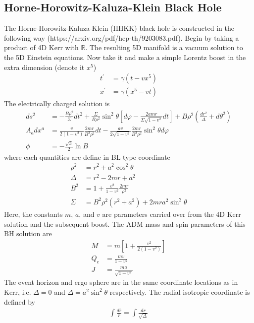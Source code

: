 \documentclass[prd]{revtex4}
\begin{document}

\subsection{Horne-Horowitz-Kaluza-Klein Black Hole}
The Horne-Horowitz-Kaluza-Klein (HHKK) black hole is constructed in the following way (https://arxiv.org/pdf/hep-th/9203083.pdf). Begin by taking a product of 4D Kerr with $\mathbb{R}$. The resulting 5D manifold is a vacuum solution to the 5D Einstein equations. Now take it and make a simple Lorentz boost in the extra dimension (denote it $x^5$)
\begin{align}
t^\prime &= \gamma (t - v x^5) \\
x^\prime &= \gamma (x^5 - v t)
\end{align}
The electrically charged solution is
\begin{align}
ds^2 &= -\frac{B \rho^2}{\Sigma} dt^2 + \frac{\Sigma}{B \rho^2} \sin^2 \theta \left[d \varphi - \frac{2 a m r}{\Sigma \sqrt{1-v^2}} dt \right] + B \rho^2 \left(\frac{d r^2}{\Delta} + d \theta^2 \right) \\
A_a dx^a &= \frac{v}{2(1-v^2)} \frac{2 m r}{B^2 \rho^2} dt - \frac{a v}{2 \sqrt{1-v^2}} \frac{2mr}{B^2 \rho^2} \sin^2 \theta d \varphi \\
\phi &= -\frac{\sqrt{3}}{2} \ln B
\end{align}
where each quantities are define in BL type coordinate
\begin{align}
\rho^2 &= r^2 + a^2 \cos^2 \theta \\
\Delta &= r^2 -2mr + a^2 \\
B^2 &= 1+ \frac{v^2}{1-v^2} \frac{2mr}{\rho^2}\\
\Sigma &= B^2 \rho^2 (r^2 + a^2) + 2 m r a^2 \sin^2 \theta
\end{align}
Here, the constants $m$, $a$, and $v$ are parameters carried over from the 4D Kerr solution and the subsequent boost. The ADM mass and spin parameters of this BH solution are
\begin{align}
M &= m \left[ 1+\frac{v^2}{2(1-v^2)} \right] \\
Q_e &= \frac{mv}{1-v^2} \\
J &= \frac{ma}{\sqrt{1-v^2}}
\end{align}
The event horizon and ergo sphere are in the same coordinate locations as in Kerr, i.e. $\Delta = 0$ and $\Delta = a^2 \sin^2 \theta$ respectively. The radial isotropic coordinate is defined by
\begin{align}
\int \frac{d \bar{r}}{\bar{r}} = \int \frac{dr}{\sqrt{\Delta}}
\end{align}
\end{document}

